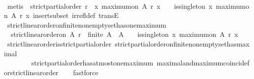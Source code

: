 \begin{isabellebody}
\ \ \ \ \isanewline
\ \ \ \ \isamarkupfalse%
\ {\isacharparenleft}metis\ {\isacartoucheopen}{\isasymnot}\ {\isacharparenleft}strict{\isacharunderscore}partial{\isacharunderscore}order\ r\ {\isasymlongrightarrow}\ {\isacharbraceleft}x{\isachardot}\ maximum{\isacharunderscore}on\ A\ r\ x{\isacharbraceright}\ {\isasymnoteq}\ {\isasymemptyset}\ {\isasymlongrightarrow}\ is{\isacharunderscore}singleton\ {\isacharbraceleft}x{\isachardot}\ maximum{\isacharunderscore}on\ A\ r\ x{\isacharbraceright}{\isacharparenright}{\isacartoucheclose}\ insert{\isacharunderscore}subset\ irrefl{\isacharunderscore}def\ transE{\isacharparenright}\isanewline
{}\isamarkupfalse%
%
\endisatagproof
{\isafoldproof}%
%
\isadelimproof
\isanewline
%
\endisadelimproof
\isanewline
{}\isamarkupfalse%
\ strict{\isacharunderscore}linear{\isacharunderscore}order{\isacharunderscore}on{\isacharunderscore}finite{\isacharunderscore}non{\isacharunderscore}empty{\isacharunderscore}set{\isacharunderscore}has{\isacharunderscore}one{\isacharunderscore}maximum\ {\isacharcolon}\isanewline
\ \ {\isachardoublequoteopen}strict{\isacharunderscore}linear{\isacharunderscore}order{\isacharunderscore}on\ A\ r\ {\isasymlongrightarrow}\ finite\ A\ {\isasymlongrightarrow}\ A\ {\isasymnoteq}\ {\isasymemptyset}\ {\isasymlongrightarrow}\ is{\isacharunderscore}singleton\ {\isacharbraceleft}x{\isachardot}\ maximum{\isacharunderscore}on\ A\ r\ x{\isacharbraceright}{\isachardoublequoteclose}\isanewline
%
\isadelimproof
\ \ %
\endisadelimproof
%
\isatagproof
{}\isamarkupfalse%
\ strict{\isacharunderscore}linear{\isacharunderscore}order{\isacharunderscore}is{\isacharunderscore}strict{\isacharunderscore}partial{\isacharunderscore}order\ strict{\isacharunderscore}partial{\isacharunderscore}order{\isacharunderscore}on{\isacharunderscore}finite{\isacharunderscore}non{\isacharunderscore}empty{\isacharunderscore}set{\isacharunderscore}has{\isacharunderscore}maximal\ \isanewline
\ \ \ \ \ \ \ \ strict{\isacharunderscore}partial{\isacharunderscore}order{\isacharunderscore}has{\isacharunderscore}at{\isacharunderscore}most{\isacharunderscore}one{\isacharunderscore}maximum\ maximal{\isacharunderscore}and{\isacharunderscore}maximum{\isacharunderscore}coincide{\isacharunderscore}for{\isacharunderscore}strict{\isacharunderscore}linear{\isacharunderscore}order\isanewline
\ \ \isamarkupfalse%
\ fastforce%
\endisatagproof
{\isafoldproof}%
%
\isadelimproof
\isanewline
%
\endisadelimproof
%
\isadelimtheory
\isanewline
%
\endisadelimtheory
%
\isatagtheory
{}\isamarkupfalse%
%
\endisatagtheory
{\isafoldtheory}%
%
\isadelimtheory
%
\endisadelimtheory
%
\end{isabellebody}%
